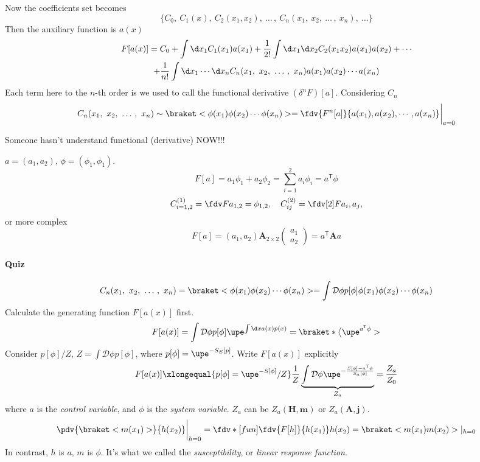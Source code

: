 Now the coefficients set becomes
\[
  \{C_0,\ C_1(x),\ C_2(x_1,x_2),\ \ldots\,,~C_n(x_1,\ x_2,\ \ldots\,,~x_n),\ \ldots\}
\]
Then the auxiliary function is $a(x)$
\begin{multline}
  F[a(x)] = C_0 + \int \d x_1 C_1(x_1) a(x_1)
      + \frac1{2!} \int\d x_1\d x_2 C_2(x_1x_2) a(x_1)a(x_2) + \cdots\\
      + \frac1{n!} \int \d x_1 \cdots \d x_n C_n(x_1,\ x_2,\ \ldots\,,~x_n)
        a(x_1) a(x_2) \cdots a(x_n)
\end{multline}
Each term here to the $n$-th order is we used to call the functional derivative $(\delta^nF)[a]$.
Considering $C_n$
\[
  C_n(x_1,\ x_2,\ \ldots\,,~x_n) \sim
  \braket<\phi(x_1) \phi(x_2) \cdots \phi(x_n)>
= \fdv{F^n[a]}{a(x_1), a(x_2), \cdots, a(x_n)}\bigg|_{a=0}
\]
\begin{framed}
  Someone hasn't understand functional (derivative) NOW!!!

  $a = (a_1, a_2)$, $\phi = (\phi_1, \phi_1)$.
  \[
    F[a] = a_1\phi_1 + a_2\phi_2 = \sum_{i=1}^2 a_i\phi_i = a^{\mathsf T}\phi
  \]
  \[
    C_{i=1,2}^{(1)} = \fdv F{a_{1,2}} = \phi_{1,2}, \quad
    C_{ij}^{(2)} = \fdv[2]F{a_i,a_j},
  \]
  or more complex
  \[
    F[a] = (a_1, a_2) \mathbf A_{2\times 2} \begin{pmatrix}
      a_1\\a_2
    \end{pmatrix} = a^{\mathsf T}\mathbf A a
  \]
\end{framed}

\paragraph{Quiz}
\begin{example}
  \[
    C_n(x_1,\ x_2,\ \ldots\,,~x_n) = \braket<\phi(x_1) \phi(x_2) \cdots \phi(x_n)>
  = \int \mathcal D\phi p[\phi] \phi(x_1) \phi(x_2) \cdots \phi(x_n)
  \]
  Calculate the generating function $F[a(x)]$ first.
  \[
    F[a(x)] = \int \mathcal D\phi p[\phi] \upe^{\int \d x a(x) p(x)}
  = \braket*\big<\upe^{a^{\mathsf T}\phi}>
  \]
  Consider $p[\phi]/Z$, $Z = \int\mathcal D\phi p[\phi]$,
  where $p[\phi] = \upe^{-S_E[p]}$.
  Write $F[a(x)]$ explicitly
  \[
    F[a(x)] \xlongequal{p[\phi]=\upe^{-S[\phi]}/Z} \frac1Z
    \underbrace{\int \mathcal D\phi \upe^{-\frac{S[\phi]-a^{\mathsf T}\phi}{S_a[\phi]}}}_{Z_a}
  = \frac{Z_a}{Z_0}
  \]
  where $a$ is the \emph{control variable},
  and $\phi$ is the \emph{system variable}.
  $Z_a$ can be $Z_a(\mathbf H, \mathbf m)$ or $Z_a(\mathbf A, \mathbf j)$.
  \[
    \pdv{\braket<m(x_1)>}{h(x_2)}\bigg|_{h=0}
  = \fdv*[fun]{\fdv{F[h]}{h(x_1)}}{h(x_2)} = \braket<m(x_1) m(x_2)>|_{h=0}
  \]
  In contrast, $h$ is $a$, $m$ is $\phi$. It's what we called the \emph{susceptibility}, or \emph{linear response function}.
\end{example}

